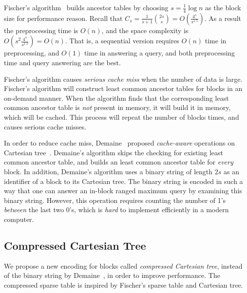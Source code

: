 Fischer's algorithm~\cite{Fischer2006TheoreticalAP} builds ancestor
tables by choosing $s = \frac{1}{4} \log n$ as the block size for
performance reason.  Recall that $C_s = \frac{1}{s+1}\binom{2s}{s} =
O(\frac{4^s}{s^{1.5}})$.  As a result the preprocessing time is
$O(n)$, and the space complexity is $O(s^2 \frac{4^s}{s^{1.5}}) =
O(n)$.  That is, a sequential version requires $O(n)$ time in
preprocessing, and $O(1)$ time in answering a query, and both
preprocessing time and query answering are the best.

Fischer's algorithm causes {\em serious cache miss} when the number of
data is large.  Fischer's algorithm will construct least common
ancestor tables for blocks in an on-demand manner.  When the algorithm
finds that the corresponding least common ancestor table is {\em not}
present in memory, it will build it in memory, which will be cached.
This process will repeat the number of blocks times, and causes
serious cache misses.

In order to reduce cache miss, Demaine~\cite{Demaine2009OnCT} proposed
{\em cache-aware} operations on Cartesian
tree~\cite{Vuillemin1980AUL}.  Demaine's algorithm skips the checking
for existing least common ancestor table, and builds an least common
ancestor table for {\em every} block.  In addition, Demaine's
algorithm uses a binary string of length $2s$ as an identifier of a
block to its Cartesian tree.  The binary string is encoded in such a
way that one can answer an in-block ranged maximum query by examining
this binary string.  However, this operation requires counting the
number of 1's {\em between} the last two 0's, which is {\em hard} to
implement efficiently in a modern computer.


\subsection{Compressed Cartesian Tree} \label{sec:cct}

We propose a new encoding for blocks called {\em compressed Cartesian
  tree}, instead of the binary string by
Demaine~\cite{Demaine2009OnCT}, in order to improve performance.  The
compressed sparse table is inspired by Fischer's sparse table and
Cartesian tree.

